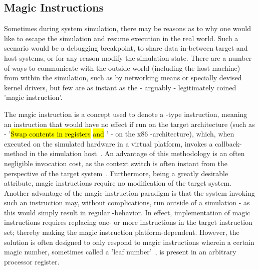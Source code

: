 \subsection{Magic Instructions}
\label{sec:backgroundandrelatedwork_magicinstructions}
Sometimes during system simulation, there may be reasons as to why one would like to escape the simulation and resume execution in the real world.
Such a scenario would be a debugging breakpoint, to share data in-between target and host systems, or for any reason modify the simulation state.
There are a number of ways to communicate with the outside world (including the host machine) from within the simulation, such as by networking means or specially devised kernel drivers, but few are as instant as the - arguably - legitimately coined 'magic instruction'.

The magic instruction is a concept used to denote a -type instruction, meaning an instruction that would have no effect if run on the target architecture (such as  - '\hl{Swap contents in registers}  \hl{and} ' - on the x86 -architecture), which, when executed on the simulated hardware in a virtual platform, invokes a callback-method in the simulation host~.
An advantage of this methodology is an often negligible invocation cost, as the context switch is often instant from the perspective of the target system~.
Furthermore, being a greatly desirable attribute, magic instructions require no modification of the target system.
Another advantage of the magic instruction paradigm is that the system invoking such an instruction may, without complications, run outside of a simulation - as this would simply result in regular -behavior.
In effect, implementation of magic instructions requires replacing one- or more instructions in the target instruction set; thereby making the magic instruction platform-dependent.
However, the solution is often designed to only respond to magic instructions wherein a certain magic number, sometimes called a 'leaf number'~, is present in an arbitrary processor register.


